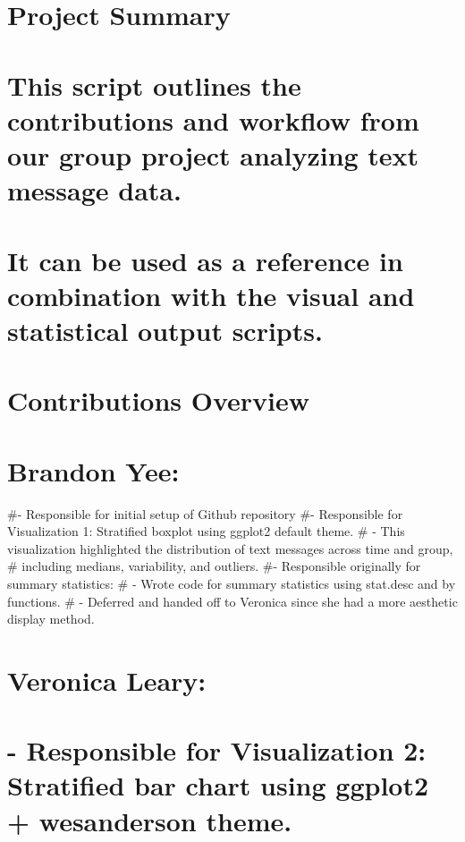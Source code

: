 \documentclass[
]{article}
\begin{document}
\section{Project Summary}\label{project-summary}

\section{This script outlines the contributions and workflow from our
group project analyzing text message
data.}\label{this-script-outlines-the-contributions-and-workflow-from-our-group-project-analyzing-text-message-data.}

\section{It can be used as a reference in combination with the visual
and statistical output
scripts.}\label{it-can-be-used-as-a-reference-in-combination-with-the-visual-and-statistical-output-scripts.}

\section{Contributions Overview}\label{contributions-overview}

\section{Brandon Yee:}\label{brandon-yee}

\#- Responsible for initial setup of Github repository \#- Responsible
for Visualization 1: Stratified boxplot using ggplot2 default theme. \#
- This visualization highlighted the distribution of text messages
across time and group, \# including medians, variability, and outliers.
\#- Responsible originally for summary statistics: \# - Wrote code for
summary statistics using stat.desc and by functions. \# - Deferred and
handed off to Veronica since she had a more aesthetic display method.

\section{Veronica Leary:}\label{veronica-leary}

\section{- Responsible for Visualization 2: Stratified bar chart using
ggplot2 + wesanderson
theme.}\label{responsible-for-visualization-2-stratified-bar-chart-using-ggplot2-wesanderson-theme.}
\end{document}
